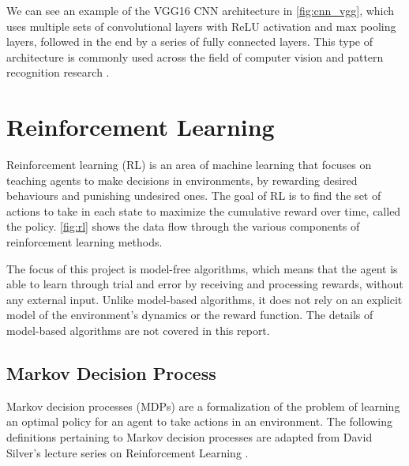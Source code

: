 We can see an example of the VGG16 CNN architecture in \autoref{fig:cnn_vgg},
which uses multiple sets of convolutional layers with ReLU activation and max
pooling layers, followed in the end by a series of fully connected layers. This
type of architecture is commonly used across the field of computer vision and
pattern recognition research \cite{simonyan2014very, lecun2015deep}.



\newpage

\section{Reinforcement Learning} \label{sec:reinforcement_learning}

Reinforcement learning (RL) is an area of machine learning that focuses on
teaching agents to make decisions in environments, by rewarding desired
behaviours and punishing undesired ones. The goal of RL is to find the set of
actions to take in each state to maximize the cumulative reward over time,
called the policy. \autoref{fig:rl} shows the data flow through the various
components of reinforcement learning methods.



The focus of this project is model-free algorithms, which means that the agent
is able to learn through trial and error by receiving and processing rewards,
without any external input. Unlike model-based algorithms, it does not rely on
an explicit model of the environment's dynamics or the reward function. The
details of model-based algorithms are not covered in this report.

\subsection{Markov Decision Process}

Markov decision processes (MDPs) are a formalization of the problem of learning
an optimal policy for an agent to take actions in an environment. The following
definitions pertaining to Markov decision processes are adapted from David
Silver's lecture series on Reinforcement Learning \cite{silver2015lecture}.

